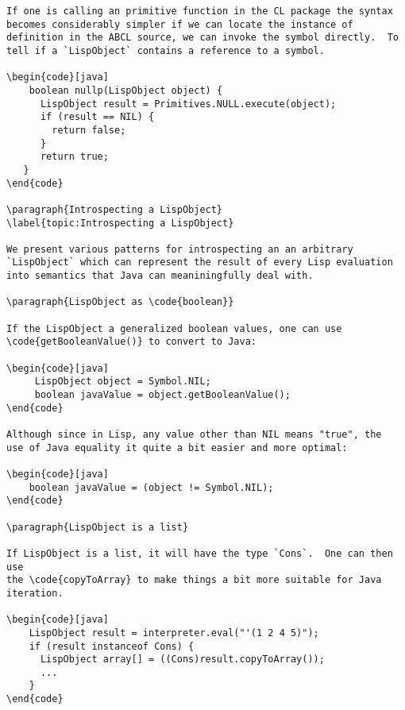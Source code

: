\begin{lstlisting}
If one is calling an primitive function in the CL package the syntax
becomes considerably simpler if we can locate the instance of
definition in the ABCL source, we can invoke the symbol directly.  To
tell if a `LispObject` contains a reference to a symbol.

\begin{code}[java]
    boolean nullp(LispObject object) {
      LispObject result = Primitives.NULL.execute(object);
      if (result == NIL) {
        return false;
      }
      return true;
   }
\end{code}

\paragraph{Introspecting a LispObject}
\label{topic:Introspecting a LispObject}

We present various patterns for introspecting an an arbitrary
`LispObject` which can represent the result of every Lisp evaluation
into semantics that Java can meaniningfully deal with.

\paragraph{LispObject as \code{boolean}}

If the LispObject a generalized boolean values, one can use
\code{getBooleanValue()} to convert to Java:

\begin{code}[java]
     LispObject object = Symbol.NIL;
     boolean javaValue = object.getBooleanValue();
\end{code}

Although since in Lisp, any value other than NIL means "true", the
use of Java equality it quite a bit easier and more optimal:

\begin{code}[java]
    boolean javaValue = (object != Symbol.NIL);
\end{code}

\paragraph{LispObject is a list}

If LispObject is a list, it will have the type `Cons`.  One can then use
the \code{copyToArray} to make things a bit more suitable for Java
iteration.

\begin{code}[java]
    LispObject result = interpreter.eval("'(1 2 4 5)");
    if (result instanceof Cons) {
      LispObject array[] = ((Cons)result.copyToArray());
      ...
    }
\end{code}
    

\end{lstlisting}
